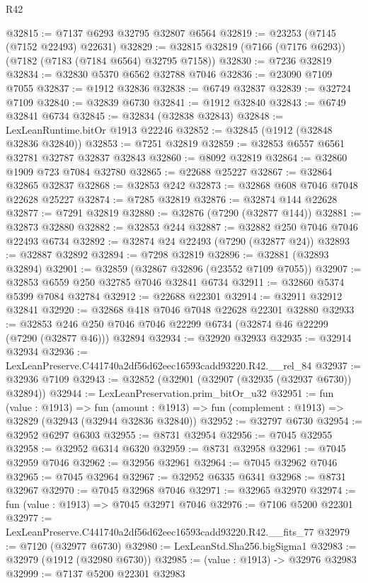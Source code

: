 \begin{lexlean}{R42}
\begin{coremodule}
{@32815 := @7137 @6293 @32795 @32807 @6564
@32819 := @23253 (@7145 (@7152 @22493) @22631)
@32829 := @32815 @32819 (@7166 (@7176 @6293)) (@7182 (@7183 (@7184 @6564) @32795 @7158))
@32830 := @7236 @32819
@32834 := @32830 @5370 @6562 @32788 @7046
@32836 := @23090 @7109 @7055
@32837 := @1912 @32836
@32838 := @6749 @32837
@32839 := @32724 @7109
@32840 := @32839 @6730
@32841 := @1912 @32840
@32843 := @6749 @32841 @6734
@32845 := @32834 (@32838 @32843)
@32848 := LexLeanRuntime.bitOr @1913 @22246
@32852 := @32845 (@1912 (@32848 @32836 @32840))
@32853 := @7251 @32819
@32859 := @32853 @6557 @6561 @32781 @32787 @32837 @32843
@32860 := @8092 @32819
@32864 := @32860 @1909 @723 @7084 @32780
@32865 := @22688 @25227
@32867 := @32864 @32865 @32837
@32868 := @32853 @242
@32873 := @32868 @608 @7046 @7048 @22628 @25227
@32874 := @7285 @32819
@32876 := @32874 @144 @22628
@32877 := @7291 @32819
@32880 := @32876 (@7290 (@32877 @144))
@32881 := @32873 @32880
@32882 := @32853 @244
@32887 := @32882 @250 @7046 @7046 @22493 @6734
@32892 := @32874 @24 @22493 (@7290 (@32877 @24))
@32893 := @32887 @32892
@32894 := @7298 @32819
@32896 := @32881 (@32893 @32894)
@32901 := @32859 (@32867 @32896 (@23552 @7109 @7055))
@32907 := @32853 @6559 @250 @32785 @7046 @32841 @6734
@32911 := @32860 @5374 @5399 @7084 @32784
@32912 := @22688 @22301
@32914 := @32911 @32912 @32841
@32920 := @32868 @418 @7046 @7048 @22628 @22301 @32880
@32933 := @32853 @246 @250 @7046 @7046 @22299 @6734 (@32874 @46 @22299 (@7290 (@32877 @46))) @32894
@32934 := @32920 @32933
@32935 := @32914 @32934
@32936 := LexLeanPreserve.C441740a2df56d62eec16593cadd93220.R42.__rel_84
@32937 := @32936 @7109
@32943 := @32852 (@32901 (@32907 (@32935 (@32937 @6730)) @32894))
@32944 := LexLeanPreservation.prim_bitOr_u32
@32951 := fun (value : @1913) =>
  fun (amount : @1913) => fun (complement : @1913) => @32829 (@32943 (@32944 @32836 @32840))
@32952 := @32797 @6730
@32954 := @32952 @6297 @6303
@32955 := @8731 @32954
@32956 := @7045 @32955
@32958 := @32952 @6314 @6320
@32959 := @8731 @32958
@32961 := @7045 @32959 @7046
@32962 := @32956 @32961
@32964 := @7045 @32962 @7046
@32965 := @7045 @32964
@32967 := @32952 @6335 @6341
@32968 := @8731 @32967
@32970 := @7045 @32968 @7046
@32971 := @32965 @32970
@32974 := fun (value : @1913) => @7045 @32971 @7046
@32976 := @7106 @5200 @22301
@32977 := LexLeanPreserve.C441740a2df56d62eec16593cadd93220.R42.__fits_77
@32979 := @7120 (@32977 @6730)
@32980 := LexLeanStd.Sha256.bigSigma1
@32983 := @32979 (@1912 (@32980 @6730))
@32985 := (value : @1913) -> @32976 @32983
@32999 := @7137
    @5200
    @22301
    @32983
}
\end{coremodule}
\end{lexlean}
